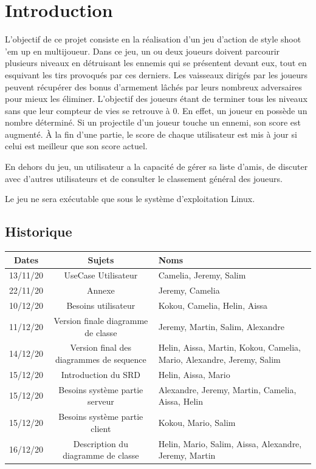 \documentclass[a4paper,12pt]{article}
\begin{document}
\newpage

\tableofcontents

\newpage


\section{Introduction}

L’objectif de ce projet consiste en la réalisation d'un jeu d'action de style shoot 'em up en multijoueur. Dans ce jeu, un ou deux joueurs doivent parcourir plusieurs niveaux en détruisant les ennemis qui se présentent devant eux, tout en esquivant les tirs provoqués par ces derniers. Les vaisseaux dirigés par les joueurs peuvent récupérer des bonus d’armement lâchés par leurs nombreux adversaires pour mieux les éliminer. L'objectif des joueurs étant de terminer tous les niveaux sans que leur compteur de vies se retrouve à 0. En effet, un joueur en possède un nombre déterminé. Si un projectile d'un joueur touche un ennemi, son score est augmenté. À la fin d'une partie, le score de chaque utilisateur est mis à jour si celui est meilleur que son score actuel.

En dehors du jeu, un utilisateur a la capacité de gérer sa liste d'amis, de discuter avec d'autres utilisateurs et de consulter le classement général des joueurs.

Le jeu ne sera exécutable que sous le système d'exploitation Linux.

\subsection{Historique}
\begin{tabularx}{15cm}{|c|c|X|}
	\hline
		Dates & Sujets & Noms \\
	\hline
		13/11/20 & UseCase Utilisateur & Camelia, Jeremy, Salim \\
	\hline
		22/11/20 & Annexe & Jeremy, Camelia \\
	\hline
		10/12/20 & Besoins utilisateur & Kokou, Camelia, Helin, Aissa\\
	\hline
		11/12/20 & Version finale diagramme de classe  & Jeremy, Martin, Salim, Alexandre\\
	\hline
		14/12/20 & Version final des diagrammes de sequence & Helin, Aissa, Martin, Kokou, Camelia, 
		Mario, Alexandre, Jeremy, Salim\\
	\hline
		15/12/20 & Introduction du SRD & Helin, Aissa, Mario\\
	\hline
		15/12/20 & Besoins système partie serveur & Alexandre, Jeremy, Martin, Camelia, Aissa, Helin\\
	\hline
		15/12/20 & Besoins système partie client & Kokou, Mario, Salim\\
	\hline
		16/12/20 & Description du diagramme de classe & Helin, Mario, Salim, Aissa,
		Alexandre, Jeremy, Martin\\
	\hline

\end{tabularx}
\end{document}
